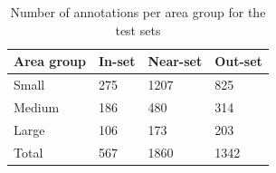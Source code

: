 \documentclass[oneside, english, bibtex]{kththesis}
\begin{document}
\begin{table}[H]
  \begin{center}
    \caption{Number of annotations per area group for the test sets}
    \label{tab:annotationspertestset}
    \begin{tabular}{l|l|l|l} %
    \textbf{Area group} & \textbf{In-set} & \textbf{Near-set} & \textbf{Out-set}  \\
    \hline
    Small & 275 & 1207 & 825  \\    \hline
    Medium & 186 & 480 & 314 \\    \hline
    Large & 106 & 173 & 203 \\    \hline
    Total & 567 & 1860 & 1342 \\    \hline
    \end{tabular}
  \end{center}
\end{table}
\end{document}

